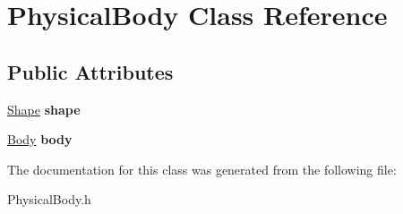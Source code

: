 \hypertarget{class_physical_body}{}\section{Physical\+Body Class Reference}
\label{class_physical_body}
\subsection*{Public Attributes}
\begin{DoxyCompactItemize}
\item 
\mbox{\label{class_physical_body_a5c08e14cfcaa3474aa98d35c612a61b9}} 
\mbox{\hyperlink{class_shape}{Shape}} {\bfseries shape}
\item 
\mbox{\label{class_physical_body_aa4550abc8868d01384a54188a0ad8bd9}} 
\mbox{\hyperlink{struct_body}{Body}} {\bfseries body}
\end{DoxyCompactItemize}


The documentation for this class was generated from the following file\+:\begin{DoxyCompactItemize}
\item 
Physical\+Body.\+h\end{DoxyCompactItemize}
